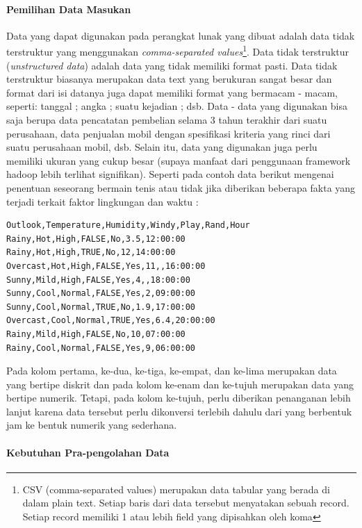\paragraph{Pemilihan Data Masukan}
Data yang dapat digunakan pada perangkat lunak yang dibuat adalah data tidak terstruktur yang menggunakan \textit{comma-separated values}\footnote{ CSV (comma-separated values) merupakan data tabular yang berada di dalam plain text. Setiap baris dari data tersebut menyatakan sebuah record. Setiap record memiliki 1 atau lebih field yang dipisahkan oleh koma}. Data tidak terstruktur (\textit{unstructured data}) adalah data yang tidak memiliki format pasti. Data tidak terstruktur biasanya merupakan data text yang berukuran sangat besar dan format dari isi datanya juga dapat memiliki format yang bermacam - macam, seperti: tanggal ; angka ; suatu kejadian ; dsb. 
Data - data yang digunakan bisa saja berupa data pencatatan pembelian selama 3 tahun terakhir dari suatu perusahaan, data penjualan mobil dengan spesifikasi kriteria yang rinci dari suatu perusahaan mobil, dsb. Selain itu, data yang digunakan juga perlu memiliki ukuran yang cukup besar (supaya manfaat dari penggunaan framework hadoop lebih terlihat signifikan). Seperti pada contoh data berikut mengenai penentuan seseorang bermain tenis atau tidak jika diberikan beberapa fakta yang terjadi terkait faktor lingkungan dan waktu :

\begin{lstlisting}
Outlook,Temperature,Humidity,Windy,Play,Rand,Hour
Rainy,Hot,High,FALSE,No,3.5,12:00:00
Rainy,Hot,High,TRUE,No,12,14:00:00
Overcast,Hot,High,FALSE,Yes,11,,16:00:00
Sunny,Mild,High,FALSE,Yes,4,,18:00:00
Sunny,Cool,Normal,FALSE,Yes,2,09:00:00
Sunny,Cool,Normal,TRUE,No,1.9,17:00:00
Overcast,Cool,Normal,TRUE,Yes,6.4,20:00:00
Rainy,Mild,High,FALSE,No,10,07:00:00
Rainy,Cool,Normal,FALSE,Yes,9,06:00:00
\end{lstlisting}
Pada kolom pertama, ke-dua, ke-tiga, ke-empat, dan ke-lima merupakan data yang bertipe diskrit dan pada kolom ke-enam dan ke-tujuh merupakan data yang bertipe numerik. Tetapi, pada kolom ke-tujuh, perlu diberikan penanganan lebih lanjut karena data tersebut perlu dikonversi terlebih dahulu dari yang berbentuk jam ke bentuk numerik yang sederhana.

\paragraph{Kebutuhan Pra-pengolahan Data}

